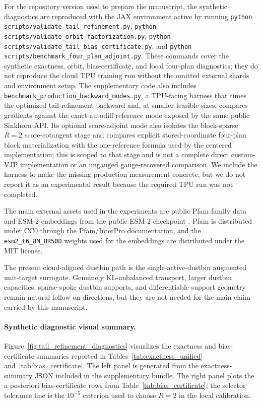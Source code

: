 For the repository version used to prepare the manuscript, the synthetic diagnostics are reproduced with the JAX environment active by running
\texttt{python scripts/validate\_tail\_refinement.py},
\texttt{python scripts/validate\_orbit\_factorization.py},
\texttt{python scripts/validate\_tail\_bias\_certificate.py}, and
\texttt{python scripts/benchmark\_four\_plan\_adjoint.py}. These commands cover the synthetic exactness, orbit, bias-certificate, and local four-plan diagnostics; they do not reproduce the cloud TPU training run without the omitted external shards and environment setup.
The supplementary code also includes \texttt{benchmark\_production\_backward\_modes.py}, a TPU-facing harness that times the optimized tail-refinement backward and, at smaller feasible sizes, compares gradients against the exact-autodiff reference mode exposed by the same public Sinkhorn API. Its optional score-adjoint mode also isolates the block-sparse $R=2$ score-cotangent stage and compares explicit stored-coordinate four-plan block materialization with the one-reference formula used by the centered implementation; this is scoped to that stage and is not a complete direct custom-VJP implementation or an ungauged gauge-recovered comparison. We include the harness to make the missing production measurement concrete, but we do not report it as an experimental result because the required TPU run was not completed.

The main external assets used in the experiments are public Pfam family data \citep{mistry2021pfam} and ESM-2 embeddings from the public ESM-2 checkpoint \citep{lin2023evolutionary}. Pfam is distributed under CC0 through the Pfam/InterPro documentation, and the \texttt{esm2\_t6\_8M\_UR50D} weights used for the embeddings are distributed under the MIT license.

The present cloud-aligned dustbin path is the single-active-dustbin augmented unit-target surrogate. Genuinely KL-unbalanced transport, larger dustbin capacities, sparse-spoke dustbin supports, and differentiable support geometry remain natural follow-on directions, but they are not needed for the main claim carried by this manuscript.

\paragraph{Synthetic diagnostic visual summary.}
Figure~\ref{fig:tail_refinement_diagnostics} visualizes the exactness and bias-certificate summaries reported in Tables~\ref{tab:exactness_unified} and~\ref{tab:bias_certificate}. The left panel is generated from the exactness-summary JSON included in the supplementary bundle. The right panel plots the a posteriori bias-certificate rows from Table~\ref{tab:bias_certificate}; the selector tolerance line is the $10^{-5}$ criterion used to choose $R=2$ in the local calibration.

